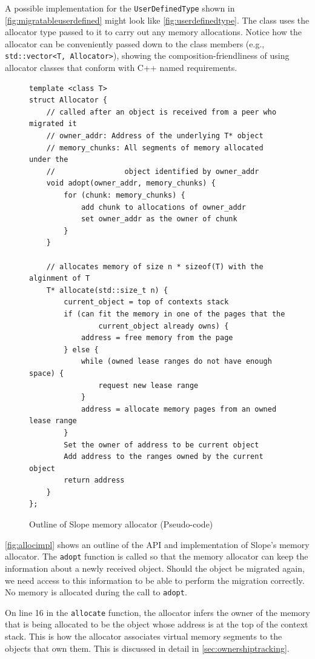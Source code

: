A possible implementation for the \texttt{UserDefinedType} shown in
\autoref{fig:migratableuserdefined} might look like \autoref{fig:userdefinedtype}.
The class uses the allocator type passed to it to carry out any memory
allocations. Notice how the allocator can be conveniently passed down to the
class members (e.g., \texttt{std::vector<T, Allocator>}), showing the
composition-friendliness of using allocator classes that conform with C++ named
requirements.


\begin{figure}[tp]
\begin{lstlisting}
template <class T>
struct Allocator {
    // called after an object is received from a peer who migrated it
    // owner_addr: Address of the underlying T* object
    // memory_chunks: All segments of memory allocated under the
    //                object identified by owner_addr
    void adopt(owner_addr, memory_chunks) {
        for (chunk: memory_chunks) {
            add chunk to allocations of owner_addr
            set owner_addr as the owner of chunk
        }
    }

    // allocates memory of size n * sizeof(T) with the alginment of T
    T* allocate(std::size_t n) {
        current_object = top of contexts stack
        if (can fit the memory in one of the pages that the
                current_object already owns) {
            address = free memory from the page
        } else {
            while (owned lease ranges do not have enough space) {
                request new lease range
            }
            address = allocate memory pages from an owned lease range
        }
        Set the owner of address to be current object
        Add address to the ranges owned by the current object
        return address
    }
};
\end{lstlisting}
    \caption{ Outline of Slope memory allocator (Pseudo-code) }
\label{fig:allocimpl}
\end{figure}


\autoref{fig:allocimpl} shows an outline of the API and implementation of Slope's
memory allocator. The \texttt{adopt} function is called so that the memory
allocator can keep the information about a newly received object.
Should the object be migrated again, we need access to this information
to be able to perform the migration correctly. No memory is allocated during the call
to \texttt{adopt}.

On line 16 in the \texttt{allocate} function, the allocator infers
the owner of the memory that is being allocated to be the object whose
address is at the top of the context stack. This is how the allocator
associates virtual memory segments to the objects that own them. This is
discussed in detail in \autoref{sec:ownershiptracking}.



